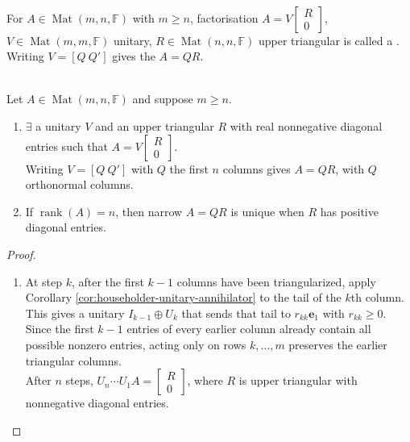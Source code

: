 \begin{definition} \label{def:wide-and-narrow-qr-factorization} \\
For $A\in\operatorname{Mat}(m,n,\mathbb{F})$ with $m\geq n$, factorisation $A=V\begin{bmatrix}R\\0\end{bmatrix}$, $V\in\operatorname{Mat}(m,m,\mathbb{F})$ unitary, $R\in\operatorname{Mat}(n,n,\mathbb{F})$ upper triangular is called a . Writing $V=[Q\ Q']$ gives the  $A=QR$.
\end{definition}

\begin{theorem} \label{thm:qr-factorization} \\
Let $A\in\operatorname{Mat}(m,n,\mathbb{F})$ and suppose $m\geq n$.
\begin{enumerate}[label=(\roman*)]
\setlength{\itemsep}{0pt}
\item $\exists$ a unitary $V$ and an upper triangular $R$ with real nonnegative diagonal entries such that $A=V\begin{bmatrix}R\\0\end{bmatrix}$.\\
Writing $V=[Q\ Q']$ with $Q$ the first $n$ columns gives $A=QR$, with $Q$ orthonormal columns.
\item If $\operatorname{rank}(A)=n$, then narrow $A=QR$ is unique when $R$ has positive diagonal entries.
\end{enumerate}
\begin{proof}
\begin{enumerate}[label=(\roman*)]
\setlength{\itemsep}{0pt}
\item
At step $k$, after the first $k-1$ columns have been triangularized, apply Corollary \ref{cor:householder-unitary-annihilator} to the tail of the $k$th column. This gives a unitary $I_{k-1}\oplus U_k$ that sends that tail to $r_{kk}\mathbf{e}_1$ with $r_{kk}\geq0$.\\
Since the first $k-1$ entries of every earlier column already contain all possible nonzero entries, acting only on rows $k,\ldots,m$ preserves the earlier triangular columns.\\
After $n$ steps, $U_n\cdots U_1A=\begin{bmatrix}R\\0\end{bmatrix}$, where $R$ is upper triangular with nonnegative diagonal entries.\\

\end{enumerate}
\end{proof}
\end{theorem}
